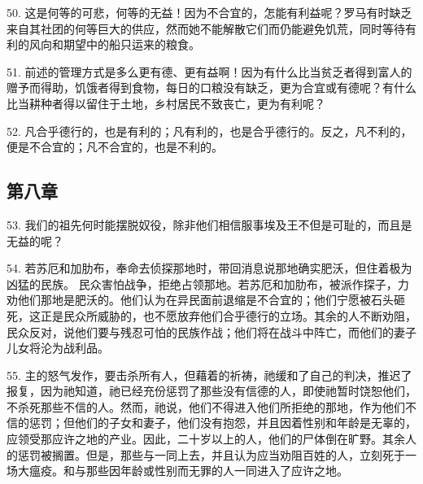 50. 这是何等的可悲，何等的无益！因为不合宜的，怎能有利益呢？罗马有时缺乏来自其社团的何等巨大的供应，然而她不能解散它们而仍能避免饥荒，同时等待有利的风向和期望中的船只运来的粮食。\par

51. 前述的管理方式是多么更有德、更有益啊！因为有什么比当贫乏者得到富人的赠予而得助，饥饿者得到食物，每日的口粮没有缺乏，更为合宜或有德呢？有什么比当耕种者得以留住于土地，乡村居民不致丧亡，更为有利呢？\par

52. 凡合乎德行的，也是有利的；凡有利的，也是合乎德行的。反之，凡不利的，便是不合宜的；凡不合宜的，也是不利的。\par


\subsection{第八章}

\par

53. 我们的祖先何时能摆脱奴役，除非他们相信服事埃及王不但是可耻的，而且是无益的呢？\par

54. 若苏厄和加肋布，奉命去侦探那地时，带回消息说那地确实肥沃，但住着极为凶猛的民族。 民众害怕战争，拒绝占领那地。若苏厄和加肋布，被派作探子，力劝他们那地是肥沃的。他们认为在异民面前退缩是不合宜的；他们宁愿被石头砸死，这正是民众所威胁的，也不愿放弃他们合乎德行的立场。其余的人不断劝阻，民众反对，说他们要与残忍可怕的民族作战；他们将在战斗中阵亡，而他们的妻子儿女将沦为战利品。\par

55. 主的怒气发作，要击杀所有人，但藉着的祈祷，祂缓和了自己的判决，推迟了报复，因为祂知道，祂已经充份惩罚了那些没有信德的人，即使祂暂时饶恕他们，不杀死那些不信的人。然而，祂说，他们不得进入他们所拒绝的那地，作为他们不信的惩罚；但他们的子女和妻子，他们没有抱怨，并且因着性别和年龄是无辜的，应领受那应许之地的产业。因此，二十岁以上的人，他们的尸体倒在旷野。其余人的惩罚被搁置。但是，那些与一同上去，并且认为应当劝阻百姓的人，立刻死于一场大瘟疫。和与那些因年龄或性别而无罪的人一同进入了应许之地。\par


